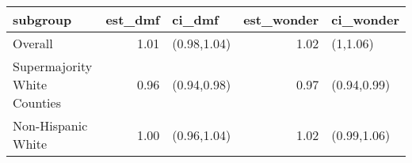 \begin{table}[ht]
\centering
\begingroup\footnotesize
\begin{tabular}{lrlrl}
  \hline
subgroup & est\_dmf & ci\_dmf & est\_wonder & ci\_wonder \\ 
  \hline
Overall & 1.01 & (0.98,1.04) & 1.02 & (1,1.06) \\ 
  Supermajority White Counties & 0.96 & (0.94,0.98) & 0.97 & (0.94,0.99) \\ 
  Non-Hispanic White & 1.00 & (0.96,1.04) & 1.02 & (0.99,1.06) \\ 
   \hline
\end{tabular}
\endgroup
\caption{} 
\end{table}
